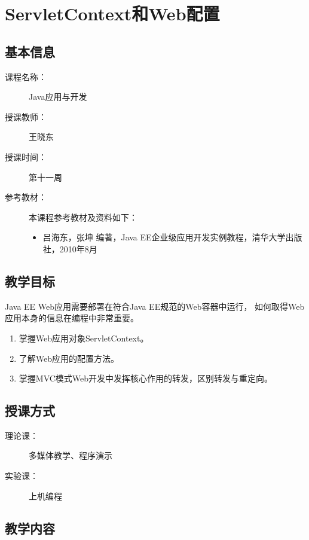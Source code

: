 \chapter{ServletContext和Web配置}
\label{chp:JavaEE-ServletContext-and-Web-configuration}

\section*{基本信息}
\sline
\begin{description}
\item[课程名称：] Java应用与开发
\item[授课教师：] 王晓东
\item[授课时间：] 第十一周
\item[参考教材：] 本课程参考教材及资料如下：
  \begin{itemize}
  \item 吕海东，张坤 编著，Java EE企业级应用开发实例教程，清华大学出版社，2010年8月
  \end{itemize}
\end{description}

\section*{教学目标}

\sline

{\hei\Blue Java EE Web应用需要部署在符合Java EE规范的Web容器中运行，
  如何取得Web应用本身的信息在编程中非常重要。}

\begin{enumerate}
\item 掌握Web应用对象ServletContext。
\item 了解Web应用的配置方法。
\item 掌握MVC模式Web开发中发挥核心作用的转发，区别{\hei 转发}与{\hei 重定向}。
\end{enumerate}  

\section*{授课方式}

\sline
\begin{description}
\item[理论课：] 多媒体教学、程序演示
\item[实验课：] 上机编程
\end{description}

\newpage
\section*{教学内容}
\sline

